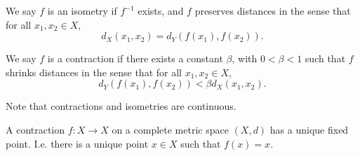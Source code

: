 \documentclass{article}
\begin{document}
\begin{definition}
    We say $f$ is an isometry if $f^{-1}$ exists, and 
    $f$ preserves distances in the sense that for all $x_1,x_2\in X$,
    \[ d_X(x_1,x_2) = d_Y(f(x_1),f(x_2)).\]
\end{definition}

\begin{definition}
    We say $f$ is a contraction if there exists a
    constant $\beta$, with 
    $0<\beta < 1$ such that
    $f$ shrinks distances in the sense that for all $x_1,x_2\in X$,
    \[  d_Y(f(x_1),f(x_2)) < \beta d_X(x_1,x_2).\]
\end{definition}

Note that contractions and isometries are continuous.

\begin{theorem}
    A contraction $f:X\to X$ on a complete metric space $(X,d)$ has
    a unique fixed point. I.e.
    there is a unique point $x\in X$ such that $f(x)=x$.
\end{theorem}
\end{document}
